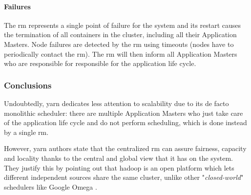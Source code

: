 \paragraph{Failures}
The \gls{rm} represents a single point of failure for the system and its restart causes the termination of all containers in the cluster, including all their Application Masters.
Node failures are detected by the \gls{rm} using timeouts (nodes have to periodically contact the \gls{rm}).
The \gls{rm} will then inform all Application Masters who are responsible for responsible for the application life cycle.

\subsubsection{Conclusions}
Undoubtedly, \glsdesc{yarn} dedicates less attention to scalability due to its de facto monolithic scheduler: there are multiple Application Masters who just take care of the application life cycle and do not perform scheduling, which is done instead by a single \gls{rm}.\par
However, \glsdesc{yarn} authors state that the centralized \gls{rm} can assure fairness, capacity and locality thanks to the central and global view that it has on the system.
They justify this by pointing out that \glsdesc{hadoop} is an open platform which lets different independent sources share the same cluster, unlike other "\textit{closed-world}" schedulers like Google Omega \cite{omega}.

